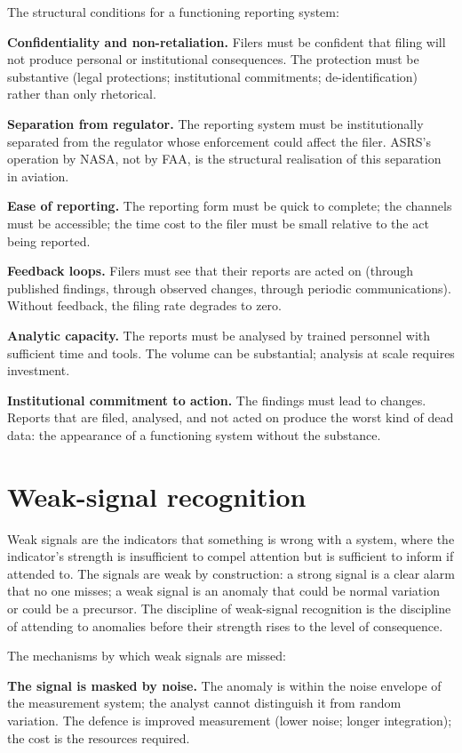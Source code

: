 The structural conditions for a functioning reporting system:

\textbf{Confidentiality and non-retaliation.} Filers must be confident that filing will not produce personal or institutional consequences. The protection must be substantive (legal protections; institutional commitments; de-identification) rather than only rhetorical.

\textbf{Separation from regulator.} The reporting system must be institutionally separated from the regulator whose enforcement could affect the filer. ASRS's operation by NASA, not by FAA, is the structural realisation of this separation in aviation.

\textbf{Ease of reporting.} The reporting form must be quick to complete; the channels must be accessible; the time cost to the filer must be small relative to the act being reported.

\textbf{Feedback loops.} Filers must see that their reports are acted on (through published findings, through observed changes, through periodic communications). Without feedback, the filing rate degrades to zero.

\textbf{Analytic capacity.} The reports must be analysed by trained personnel with sufficient time and tools. The volume can be substantial; analysis at scale requires investment.

\textbf{Institutional commitment to action.} The findings must lead to changes. Reports that are filed, analysed, and not acted on produce the worst kind of dead data: the appearance of a functioning system without the substance.

\section{Weak-signal recognition}

Weak signals are the indicators that something is wrong with a system, where the indicator's strength is insufficient to compel attention but is sufficient to inform if attended to. The signals are weak by construction: a strong signal is a clear alarm that no one misses; a weak signal is an anomaly that could be normal variation or could be a precursor. The discipline of weak-signal recognition is the discipline of attending to anomalies before their strength rises to the level of consequence.

The mechanisms by which weak signals are missed:

\textbf{The signal is masked by noise.} The anomaly is within the noise envelope of the measurement system; the analyst cannot distinguish it from random variation. The defence is improved measurement (lower noise; longer integration); the cost is the resources required.

